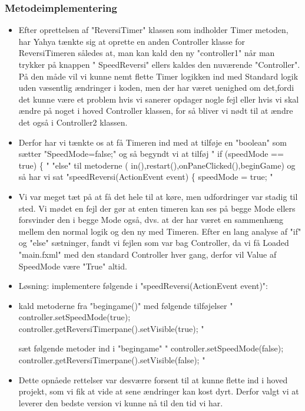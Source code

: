 \subsubsection{Metodeimplementering}\label{MI}
\begin{itemize}
\item Efter oprettelsen af "ReversiTimer" klassen som indholder Timer metoden, har Yahya tænkte sig at oprette en anden Controller klasse for ReversiTimeren således at, man kan kald den ny "controller1" når man trykker på knappen " SpeedReversi" ellers kaldes den nuværende "Controller".
På den måde vil vi kunne nemt flette Timer logikken ind med Standard logik uden væsentlig ændringer i koden, men der har været uenighed om det,fordi det kunne være et problem hvis vi sanerer opdager nogle fejl eller hvis vi skal ændre på noget i hoved Controller klassen, for så bliver vi nødt til at ændre det også i Controller2 klassen. 
\item Derfor har vi tænkte os at få Timeren ind med at tilføje en "boolean" som sætter "SpeedMode=false;" og så begyndt vi at tilføj 
" if (speedMode == true) \{ " "else" til metoderne ( in(),restart(),onPaneClicked(),beginGame) og så har vi sat 
"speedReversi(ActionEvent event) \{	
		speedMode = true; "
\item Vi var meget tæt på at få det hele til at køre, men udfordringer var stadig til sted. Vi mødet en fejl der gør at enten timeren kan ses på begge Mode ellers forsvinder den i begge Mode også, dvs. at der har været en sammenhæng mellem den normal logik og den ny med Timeren.
Efter en lang analyse af "if" og "else" sætninger, fandt vi fejlen som var bag Controller, da vi få Loaded "main.fxml" med den standard Controller hver gang, derfor vil Value af SpeedMode være "True" altid. 

\item Løsning: 
implementere følgende i "speedReversi(ActionEvent event)":
\item kald metoderne fra "begingame()" med følgende tilføjelser 
" controller.setSpeedMode(true);
            controller.getReversiTimerpane().setVisible(true); " 

   sæt følgende metoder ind i "begingame"
   " controller.setSpeedMode(false);
        controller.getReversiTimerpane().setVisible(false); "

\item Dette opnåede rettelser var desværre forsent til at kunne flette ind i hoved projekt, som vi fik at vide at sene ændringer kan kost dyrt. Derfor valgt vi at leverer den bedste version vi kunne nå til den tid vi har. 
\end{itemize}








